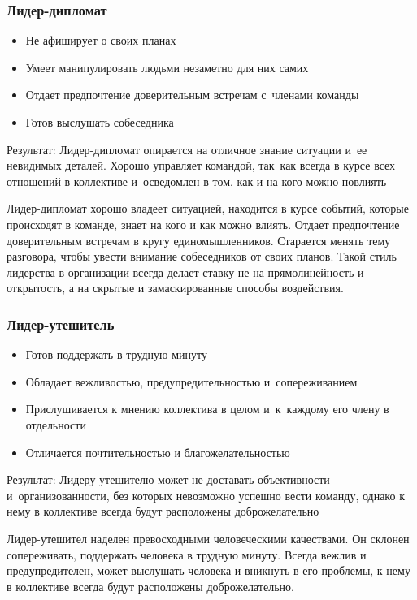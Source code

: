 \documentclass{../industrial-development}
\begin{document}
\begin{frame} \frametitle{Лидер-дипломат}
\begin{itemize}
  \item Не афиширует о своих планах
  \item Умеет манипулировать людьми незаметно для них самих
  \item Отдает предпочтение доверительным встречам с~членами команды
  \item Готов выслушать собеседника
  \end{itemize}
  \begin{block}{Результат:}
   Лидер-дипломат опирается на отличное знание ситуации и~ее невидимых деталей. Хорошо управляет командой, так~как всегда в курсе всех отношений в коллективе и~осведомлен в том, как и на кого можно повлиять	
  \end{block}
\end{frame}
\lecturenotes Лидер-дипломат хорошо владеет ситуацией, находится в курсе событий, которые происходят в команде, знает на кого и как можно влиять. Отдает предпочтение доверительным встречам в кругу единомышленников. Старается менять тему разговора, чтобы увести внимание собеседников от своих планов. Такой стиль лидерства в организации всегда делает ставку не на прямолинейность и открытость, а на скрытые и замаскированные способы воздействия.


\begin{frame} \frametitle{Лидер-утешитель}
\begin{itemize}
  \item Готов поддержать в трудную минуту
  \item Обладает вежливостью, предупредительностью и~сопереживанием
  \item Прислушивается к мнению коллектива в целом и~к~каждому его члену в отдельности
  \item Отличается почтительностью и благожелательностью
  \end{itemize}
  \begin{block}{Результат:}
Лидеру-утешителю может не доставать объективности и~организованности, без которых невозможно успешно вести команду, однако к нему в коллективе всегда будут расположены доброжелательно
  \end{block}
\end{frame}
\lecturenotes Лидер-утешител наделен превосходными человеческими качествами. Он склонен сопереживать, поддержать человека в трудную минуту. Всегда вежлив и предупредителен, может выслушать человека и вникнуть в его проблемы, к нему в коллективе всегда будут расположены доброжелательно.
\end{document}
